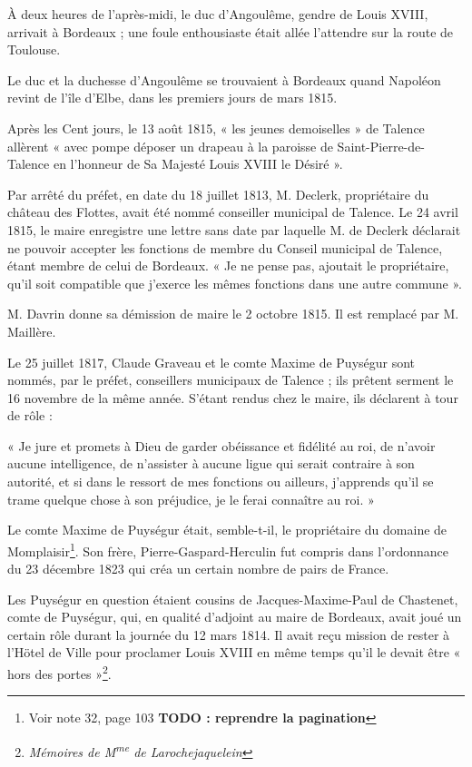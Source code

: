 \documentclass[a4paper,11pt]{book}
\begin{document}
À deux heures de l'après-midi, le duc d'Angoulême, gendre de Louis XVIII, arrivait à Bordeaux ; une foule enthousiaste était allée l'attendre sur la route de Toulouse.

Le duc et la duchesse d'Angoulême se trouvaient à Bordeaux quand Napoléon revint de l'île d'Elbe, dans les premiers jours de mars 1815.

Après les Cent jours, le 13 août 1815, « les jeunes demoiselles » de Talence allèrent « avec pompe déposer un drapeau à la paroisse de Saint-Pierre-de-Talence en l'honneur de Sa Majesté Louis XVIII le Désiré ».

Par arrêté du préfet, en date du 18 juillet 1813, M. Declerk, propriétaire du château des Flottes, avait été nommé conseiller municipal de Talence. Le 24 avril 1815, le maire enregistre une lettre sans date par laquelle M. de Declerk déclarait ne pouvoir accepter les fonctions de membre du Conseil municipal de Talence, étant membre de celui de Bordeaux. « Je ne pense pas, ajoutait le propriétaire, qu'il soit compatible que j'exerce les mêmes fonctions dans une autre commune ».

M. Davrin donne sa démission de maire le 2 octobre 1815. Il est remplacé par M. Maillère.

Le 25 juillet 1817, Claude Graveau et le comte Maxime de Puységur sont nommés, par le préfet, conseillers municipaux de Talence ; ils prêtent serment le 16 novembre de la même année. S'étant rendus chez le maire, ils déclarent à tour de rôle :

« Je jure et promets à Dieu de garder obéissance et fidélité au roi, de n'avoir aucune intelligence, de n'assister à aucune ligue qui serait contraire à son autorité, et si dans le ressort de mes fonctions ou ailleurs, j'apprends qu'il se trame quelque chose à son préjudice, je le ferai connaître au roi. »

Le comte Maxime de Puységur était, semble-t-il, le propriétaire du domaine de Momplaisir\footnote{Voir note 32, page 103 \textbf{TODO : reprendre la pagination}}. Son frère, Pierre-Gaspard-Herculin fut compris dans l'ordonnance du 23 décembre 1823 qui créa un certain nombre de pairs de France.

Les Puységur en question étaient cousins de Jacques-Maxime-Paul de Chastenet, comte de Puységur, qui, en qualité d'adjoint au maire de Bordeaux, avait joué un certain rôle durant la journée du 12 mars 1814. Il avait reçu mission de rester à l'Hötel de Ville pour proclamer Louis XVIII en même temps qu'il le devait être « hors des portes »\footnote{\textit{Mémoires de M\textsuperscript{me} de Larochejaquelein}}.
\end{document}
